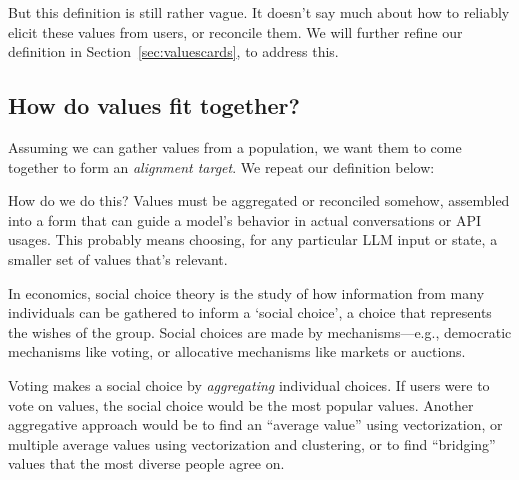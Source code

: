 \documentclass{article}
\theoremstyle{definition}
\newtheorem{definition}{Definition}[section]
\begin{document}
But this definition is still rather vague. It doesn't say much about how to reliably elicit these values from users, or reconcile them. We will further refine our definition in Section~\ref{sec:valuescards}, to address this.

\subsection{How do values fit together?}\label{sec:howdovaluesfittogether}

Assuming we can gather values from a population, we want them to come together to form an \textit{alignment target}. We repeat our definition below:


How do we do this? Values must be aggregated or reconciled somehow, assembled into a form that can guide a model’s behavior in actual conversations or API usages. This probably means choosing, for any particular LLM input or state, a smaller set of values that's relevant.

In economics, social choice theory \citep{Arrow1951, Sen1970} is the study of how information from many individuals can be gathered to inform a `social choice', a choice that represents the wishes of the group. Social choices are made by mechanisms---e.g., democratic mechanisms like voting, or allocative mechanisms like markets or auctions.

Voting makes a social choice by \textit{aggregating} individual choices. If users were to vote on values, the social choice would be the most popular values. Another aggregative approach would be to find an ``average value'' using vectorization, or multiple average values using vectorization and clustering, or to find “bridging” values \citep{ovadya2023} that the most diverse people agree on.
\end{document}
